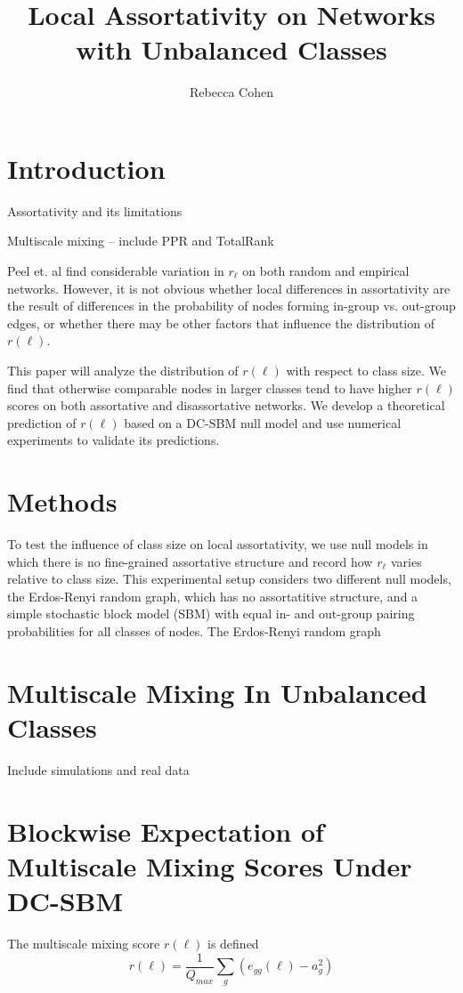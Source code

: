 \documentclass[12pt]{article}
\title{Local Assortativity on Networks with Unbalanced Classes}
\author{Rebecca Cohen}
\begin{document}
\maketitle
\section{Introduction}
Assortativity and its limitations

Multiscale mixing -- include PPR and TotalRank

Peel et. al find considerable variation in $r_\ell$ on both random and empirical networks.  However, it is not obvious whether local differences in assortativity are the result of differences in the probability of nodes forming in-group vs. out-group edges, or whether there may be other factors that influence the distribution of $r(\ell)$.

This paper will analyze the distribution of $r(\ell)$ with respect to class size.  We find that otherwise comparable nodes in larger classes tend to have higher $r(\ell)$ scores on both assortative and disassortative networks.  We develop a theoretical prediction of $r(\ell)$ based on a DC-SBM null model and use numerical experiments to validate its predictions.

\section{Methods}
To test the influence of class size on local assortativity, we use null models in which there is no fine-grained assortative structure and record how $r_\ell$ varies relative to class size.  This experimental setup considers two different null models, the Erdos-Renyi random graph, which has no assortatitive structure, and a simple stochastic block model (SBM) with equal in- and out-group pairing probabilities for all classes of nodes.  The Erdos-Renyi random graph 

\section{Multiscale Mixing In Unbalanced Classes}
Include simulations and real data


\section{Blockwise Expectation of Multiscale Mixing Scores Under DC-SBM}
The multiscale mixing score $r(\ell)$ is defined
\begin{equation}
  r(\ell) = \frac{1}{Q_{max}} \sum_g (e_{gg}(\ell) - a_g^2)
\end{equation}
\end{document}
